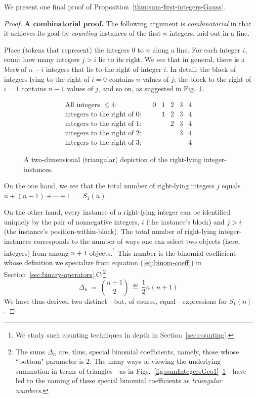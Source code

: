 \medskip

We present one final proof of
Proposition~\ref{thm:sum-first-integers-Gauss}.

\begin{proof}
{\bf A combinatorial proof.}
%
The following argument is {\it combinatorial} in that it achieves its
goal by {\em counting} instances of the first $n$ integers, laid out
in a line.

Place (tokens that represent) the integers $0$ to $n$ along a line.
For each integer $i$, count how many integers $j > i$ lie to its
right.  We see that in general, there is a {\it block} of $n-i$
integers that lie to the right of integer $i$.  In detail: the block
of integers lying to the right of $i=0$ contains $n$ values of $j$;
the block to the right of $i=1$ contains $n-1$ values of $j$, and so
on, as suggested in Fig.~\ref{fig:rightward-instances}.

\begin{figure}[htb]
\[
\begin{array}{lcccccc}
\mbox{All integers $\leq 4$:} &
 & 0 & 1 & 2 & 3 & 4 \\
\mbox{integers to the right of $0$:} &
 &   & 1 & 2 & 3 & 4 \\
\mbox{integers to the right of $1$:} &
 &   &   & 2 & 3 & 4 \\
\mbox{integers to the right of $2$:} &
 &   &   &   & 3 & 4 \\
\mbox{integers to the right of $3$:} &
 &   &   &   &   & 4
\end{array}
\]
\caption{A two-dimensional (triangular) depiction of the right-lying
  integer-instances.}
\label{fig:rightward-instances}
\end{figure}

On the one hand, we see that the total number of right-lying integers
$j$ equals $n+(n-1)+ \cdots + 1 \ = \ S_1(n)$.

On the other hand, every instance of a right-lying integer can be
identified uniquely by the pair of nonnegative integers, $i$ (the
instance's block) and $j>i$ (the instance's position-within-block).
The total number of right-lying integer-instances corresponds to the
number of ways one can select two objects (here, integers) from among $n+1$ objects.\footnote{We
  study such counting techniques in depth in
  Section~\ref{sec:counting}.}  This number is the binomial
coefficient whose definition we specialize from equation
(\ref{eq:binom-coeff}) in
Section~\ref{sec:binary-operators}.C:\footnote{The sums $\Delta_n$
  are, thus, special binomial coefficients, namely, those whose ``bottom" parameter is $2$.
  The many ways of viewing the underlying summation in terms of triangles---as in
  Figs.~\ref{fig:sumIntegersGeo1}--\ref{fig:rightward-instances}---have
  led to the naming of these special binomial coefficients
  as {\it triangular numbers}.  
   }
\[
\Delta_n  \ = \  {{n+1} \choose 2}  \  \eqdef  \  \frac{1}{2} n(n+1)
\]
We have thus derived two distinct---but, of course,
equal---expressions for $S_1(n)$.
\end{proof}
\medskip

